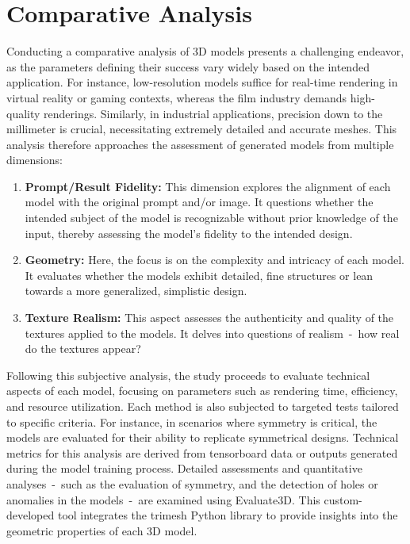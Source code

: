 \section{Comparative Analysis}\label{comparativeAnalysis}

Conducting a comparative analysis of 3D models presents a challenging endeavor, as the parameters defining their success vary widely based on the intended application. For instance, low-resolution models suffice for real-time rendering in virtual reality or gaming contexts, whereas the film industry demands high-quality renderings. Similarly, in industrial applications, precision down to the millimeter is crucial, necessitating extremely detailed and accurate meshes. This analysis therefore approaches the assessment of generated models from multiple dimensions:

\begin{enumerate}
    \item \textbf{Prompt/Result Fidelity:} This dimension explores the alignment of each model with the original prompt and/or image. It questions whether the intended subject of the model is recognizable without prior knowledge of the input, thereby assessing the model's fidelity to the intended design.
    \item \textbf{Geometry:} Here, the focus is on the complexity and intricacy of each model. It evaluates whether the models exhibit detailed, fine structures or lean towards a more generalized, simplistic design. 
    \item \textbf{Texture Realism:} This aspect assesses the authenticity and quality of the textures applied to the models. It delves into questions of realism~-~how real do the textures appear?
\end{enumerate}

Following this subjective analysis, the study proceeds to evaluate technical aspects of each model, focusing on parameters such as rendering time, efficiency, and resource utilization. Each method is also subjected to targeted tests tailored to specific criteria. For instance, in scenarios where symmetry is critical, the models are evaluated for their ability to replicate symmetrical designs. Technical metrics for this analysis are derived from tensorboard data or outputs generated during the model training process. Detailed assessments and quantitative analyses~-~such as the evaluation of symmetry, and the detection of holes or anomalies in the models~-~are examined using Evaluate3D. This custom-developed tool integrates the trimesh Python library \citep{trimesh} to provide insights into the geometric properties of each 3D model.



 
    
    
    